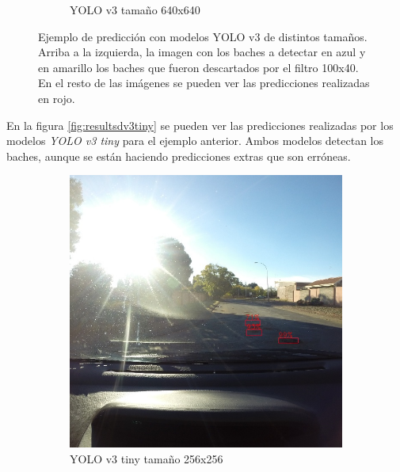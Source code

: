 \begin{figure}[H]
\begin{subfigure}[h]{0.45\linewidth}
		\caption{YOLO v3 tamaño 640x640}
	\end{subfigure}
	\caption{Ejemplo de predicción con modelos YOLO v3 de distintos tamaños. Arriba a la izquierda, la imagen con los baches a detectar en azul y en amarillo los baches que fueron descartados por el filtro 100x40. En el resto de las imágenes se pueden ver las predicciones realizadas en rojo.}
	\label{fig:resultsdv3}
\end{figure}

En la figura \ref{fig:resultsdv3tiny} se pueden ver las predicciones realizadas por los modelos \textit{YOLO v3 tiny} para el ejemplo anterior. Ambos modelos detectan los baches, aunque se están haciendo predicciones extras que son erróneas.

\begin{figure}[H]
	\centering
	\begin{subfigure}[h]{0.45\linewidth}
		\includegraphics[width=\linewidth]{images/results_d_yolo_v3_tiny_256.jpg}
		\caption{YOLO v3 tiny tamaño 256x256}
	\end{subfigure}
	\begin{subfigure}[h]{0.45\linewidth}

\end{subfigure}
\end{figure}
